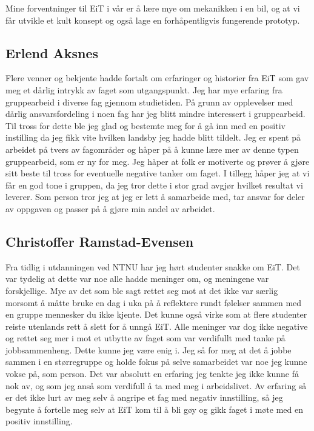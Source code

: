 Mine forventninger til EiT i vår er å lære mye om mekanikken i en bil, og at 
vi får utvikle et kult konsept og også lage en forhåpentligvis fungerende prototyp.

\subsection*{Erlend Aksnes} Flere venner og bekjente hadde fortalt om erfaringer og historier fra EiT som gav meg et dårlig intrykk av faget som utgangspunkt. 
Jeg har mye erfaring fra gruppearbeid i diverse fag gjennom studietiden.
 På grunn av opplevelser med dårlig ansvarsfordeling i noen fag har jeg blitt mindre interessert i gruppearbeid. 
Til tross for dette ble jeg glad og bestemte meg for å gå inn med en positiv instilling da jeg fikk vite hvilken landsby jeg hadde blitt tildelt. 
Jeg er spent på arbeidet på tvers av fagområder og håper på å kunne lære mer av denne typen gruppearbeid, som er ny for meg.  
Jeg håper at folk er motiverte og prøver å gjøre sitt beste til tross for eventuelle negative tanker om faget. 
I tillegg håper jeg at vi får en god tone i gruppen, da jeg tror dette i stor grad avgjør hvilket resultat vi leverer. 
Som person tror jeg at jeg er lett å samarbeide med, tar ansvar for deler av oppgaven og passer på å gjøre min andel av arbeidet. 

\subsection*{Christoffer Ramstad-Evensen}
Fra tidlig i utdanningen ved NTNU har jeg hørt studenter snakke om EiT. Det var tydelig at dette var noe alle hadde 
meninger om, og meningene var forskjellige. Mye av det som ble sagt rettet seg mot at det ikke var særlig morsomt 
å måtte bruke en dag i uka på å reflektere rundt følelser sammen med en gruppe mennesker du ikke kjente. Det 
kunne også virke som at flere studenter reiste utenlands rett å slett for å unngå EiT. Alle meninger var dog ikke 
negative og rettet seg mer i mot et utbytte av faget som var verdifullt med tanke på jobbsammenheng. Dette kunne 
jeg være enig i. Jeg så for meg at det å jobbe sammen i en størregruppe og holde fokus på selve samarbeidet var 
noe jeg kunne vokse på, som person. Det var absolutt en erfaring jeg tenkte jeg ikke kunne få nok av, og som jeg 
anså som verdifull å ta med meg i arbeidslivet. Av erfaring så er det ikke lurt av meg selv å angripe et fag med 
negativ innstilling, så jeg begynte å fortelle meg selv at EiT kom til å bli gøy og gikk faget i møte med en positiv 
innstilling. 

